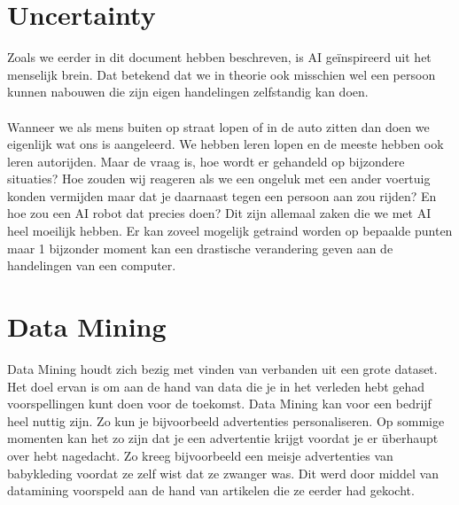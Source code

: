 \documentclass{article}
\begin{document}



\section{Uncertainty}
Zoals we eerder in dit document hebben beschreven, is AI geïnspireerd uit het menselijk brein. Dat betekend dat we in theorie ook misschien wel een persoon kunnen nabouwen die zijn eigen handelingen zelfstandig kan doen. 
\\\\
Wanneer we als mens buiten op straat lopen of in de auto zitten dan doen we eigenlijk wat ons is aangeleerd. We hebben leren lopen en de meeste hebben ook leren autorijden. Maar de vraag is, hoe wordt er gehandeld op bijzondere situaties? Hoe zouden wij reageren als we een ongeluk met een ander voertuig konden vermijden maar dat je daarnaast tegen een persoon aan zou rijden? En hoe zou een AI robot dat precies doen? Dit zijn allemaal zaken die we met AI heel moeilijk hebben. Er kan zoveel mogelijk getraind worden op bepaalde punten maar 1 bijzonder moment kan een drastische verandering geven aan de handelingen van een computer.


\section{Data Mining}
Data Mining houdt zich bezig met vinden van verbanden uit een grote dataset\cite{datamining}. Het doel ervan is om aan de hand van data die je in het verleden hebt gehad voorspellingen kunt doen voor de toekomst. Data Mining kan voor een bedrijf heel nuttig zijn. Zo kun je bijvoorbeeld advertenties personaliseren. Op sommige momenten kan het zo zijn dat je een advertentie krijgt voordat je er überhaupt over hebt nagedacht. Zo kreeg bijvoorbeeld een meisje advertenties van babykleding voordat ze zelf wist dat ze zwanger was\cite{preg}. Dit werd door middel van datamining voorspeld aan de hand van artikelen die ze eerder had gekocht.
\end{document}
